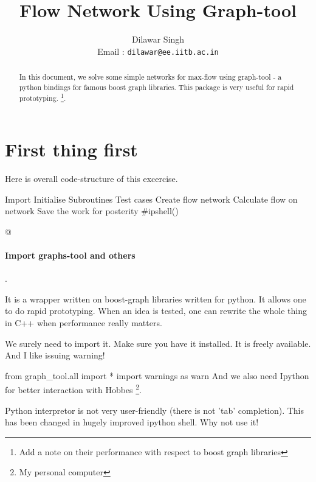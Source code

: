 \documentclass[10pt,a4paper]{article}%
\author{Dilawar Singh \\
Email : \texttt{dilawar@ee.iitb.ac.in}}
\title{Flow Network Using {\Tt{}Graph-tool\nwendquote}}
\begin{document}
\nwdocspar
\maketitle
\begin{abstract}
    
    In this document, we solve some simple networks for max-flow using
    {\Tt{}graph-tool\nwendquote} - a python bindings for famous boost graph libraries. This
    package is very useful for rapid prototyping. \footnote{Add a note on their
    performance with respect to boost graph libraries}.

\end{abstract}

\nwenddocs{}\section{First thing first}

Here is overall code-structure of this excercise.

\nwenddocs{}\moddef{*}\endmoddef\nwstartdeflinemarkup\nwenddeflinemarkup
\LA{}Import\RA{}
\LA{}Initialise\RA{}
\LA{}Subroutines\RA{}
\LA{}Test cases\RA{}
\LA{}Create flow network\RA{}
\LA{}Calculate flow on network\RA{}
\LA{}Save the work for posterity\RA{}
#ipshell()
\eatline
\nwendcode{}\nwdocspar

@\paragraph{Import {\Tt{}graphs-tool\nwendquote} and others}. 
    
    It is a wrapper written on boost-graph libraries written for python. It
    allows one to do rapid prototyping. When an idea is tested, one can rewrite
    the whole thing in C++ when performance really matters.

    We surely need to import it. Make sure you have it installed. It is freely
    available. And I like issuing warning!

\nwenddocs{}\endmoddef\nwstartdeflinemarkup\nwenddeflinemarkup
from graph_tool.all import * 
import warnings as warn
\nwendcode{}And we also need {\Tt{}Ipython\nwendquote} for better interaction with Hobbes \footnote{My
personal computer}.

    Python interpretor is not very user-friendly (there is not 'tab'
    completion). This has been changed in hugely improved {\Tt{}ipython\nwendquote} shell. Why
    not use it!
\end{document}
